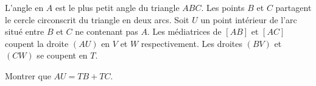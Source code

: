 L'angle en $A$ est le plus petit angle du triangle $ABC$. Les points $B$ et $C$ partagent le cercle circonscrit du triangle en deux arcs. Soit $U$ un point intérieur de l'arc situé entre $B$ et $C$ ne contenant pas $A$. Les médiatrices de $[AB]$ et $[AC]$ coupent la droite $(AU)$ en $V$ et $W$ respectivement. Les droites $(BV)$ et $(CW)$ se coupent en $T$.

Montrer que $AU = TB + TC$.
